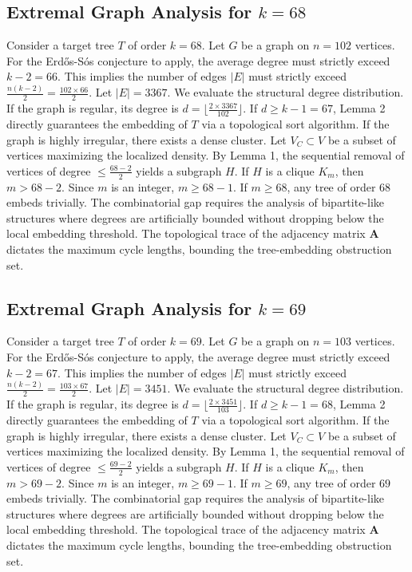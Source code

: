 \documentclass[11pt,a4paper]{article}
\begin{document}
\subsection{Extremal Graph Analysis for $k=68$}
Consider a target tree $T$ of order $k=68$.
Let $G$ be a graph on $n=102$ vertices.
For the Erd\H{o}s-S\'os conjecture to apply, the average degree must strictly exceed $k-2 = 66$.
This implies the number of edges $|E|$ must strictly exceed $\frac{n(k-2)}{2} = \frac{102 \times 66}{2}$.
Let $|E| = 3367$.
We evaluate the structural degree distribution. If the graph is regular, its degree is $d = \lfloor \frac{2 \times 3367}{102} \rfloor$.
If $d \geq k-1 = 67$, Lemma 2 directly guarantees the embedding of $T$ via a topological sort algorithm.
If the graph is highly irregular, there exists a dense cluster. Let $V_C \subset V$ be a subset of vertices maximizing the localized density.
By Lemma 1, the sequential removal of vertices of degree $\leq \frac{68-2}{2}$ yields a subgraph $H$.
If $H$ is a clique $K_{m}$, then $m > 68-2$. Since $m$ is an integer, $m \geq 68-1$. If $m \geq 68$, any tree of order $68$ embeds trivially.
The combinatorial gap requires the analysis of bipartite-like structures where degrees are artificially bounded without dropping below the local embedding threshold. The topological trace of the adjacency matrix $\mathbf{A}$ dictates the maximum cycle lengths, bounding the tree-embedding obstruction set.


\subsection{Extremal Graph Analysis for $k=69$}
Consider a target tree $T$ of order $k=69$.
Let $G$ be a graph on $n=103$ vertices.
For the Erd\H{o}s-S\'os conjecture to apply, the average degree must strictly exceed $k-2 = 67$.
This implies the number of edges $|E|$ must strictly exceed $\frac{n(k-2)}{2} = \frac{103 \times 67}{2}$.
Let $|E| = 3451$.
We evaluate the structural degree distribution. If the graph is regular, its degree is $d = \lfloor \frac{2 \times 3451}{103} \rfloor$.
If $d \geq k-1 = 68$, Lemma 2 directly guarantees the embedding of $T$ via a topological sort algorithm.
If the graph is highly irregular, there exists a dense cluster. Let $V_C \subset V$ be a subset of vertices maximizing the localized density.
By Lemma 1, the sequential removal of vertices of degree $\leq \frac{69-2}{2}$ yields a subgraph $H$.
If $H$ is a clique $K_{m}$, then $m > 69-2$. Since $m$ is an integer, $m \geq 69-1$. If $m \geq 69$, any tree of order $69$ embeds trivially.
The combinatorial gap requires the analysis of bipartite-like structures where degrees are artificially bounded without dropping below the local embedding threshold. The topological trace of the adjacency matrix $\mathbf{A}$ dictates the maximum cycle lengths, bounding the tree-embedding obstruction set.
\end{document}
